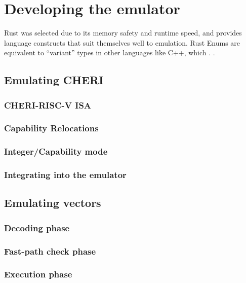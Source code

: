 \section{Developing the emulator}\label{chap:software:sec:emu}
Rust was selected due to its memory safety and runtime speed, and provides language constructs that suit themselves well to emulation.
Rust Enums are equivalent to \enquote{variant} types in other languages like C++, which \todomark{}.
.

\subsection{Emulating CHERI}

\subsubsection{}

\subsubsection{CHERI-RISC-V ISA}

\subsubsection{Capability Relocations}

\subsubsection{Integer/Capability mode}

\subsubsection{Integrating into the emulator}

\subsection{Emulating vectors}

\subsubsection{Decoding phase}

\subsubsection{Fast-path check phase}

\subsubsection{Execution phase}

